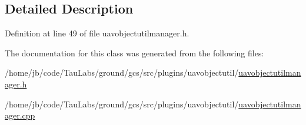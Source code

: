 \subsection{\-Detailed \-Description}


\-Definition at line 49 of file uavobjectutilmanager.\-h.



\-The documentation for this class was generated from the following files\-:\begin{DoxyCompactItemize}
\item 
/home/jb/code/\-Tau\-Labs/ground/gcs/src/plugins/uavobjectutil/\hyperlink{uavobjectutilmanager_8h}{uavobjectutilmanager.\-h}\item 
/home/jb/code/\-Tau\-Labs/ground/gcs/src/plugins/uavobjectutil/\hyperlink{uavobjectutilmanager_8cpp}{uavobjectutilmanager.\-cpp}\end{DoxyCompactItemize}
